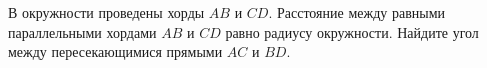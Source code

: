 \begin{ex}
	\begin{condition}
		В окружности проведены хорды \( AB  \) и \( CD \). Расстояние между равными параллельными хордами \( AB  \) и \( CD  \) равно радиусу окружности. Найдите угол между пересекающимися прямыми \( AC  \) и \( BD \).
	\end{condition}
	\answer{\( 60\degree \)}
\end{ex}